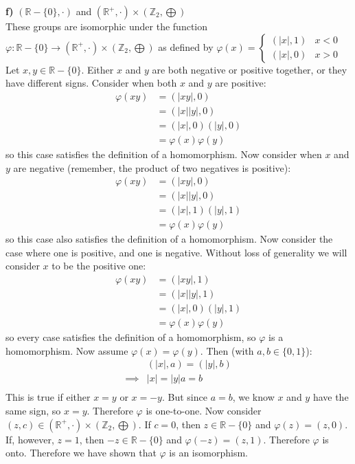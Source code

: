 \documentclass{scrartcl}
\begin{document}
\textbf{f)} $(\mathbb{R}-\{0\},\cdot)$ and
$(\mathbb{R}^+,\cdot)\times(\mathbb{Z}_2,\bigoplus)$\\
These groups are isomorphic under the function $\varphi : \mathbb{R} - \{0\}
\rightarrow (\mathbb{R}^+,\cdot)\times(\mathbb{Z}_2,\bigoplus)$ as defined by
$\varphi(x) =
  \begin{cases}
    (|x|,1) & x < 0\\
    (|x|,0) & x > 0
  \end{cases}$
Let $x,y \in \mathbb{R} - \{0\}$. Either $x$ and $y$ are both negative or
positive together, or they have different signs. Consider when both $x$ and $y$
are positive:
\begin{align*}
\varphi(xy) &= (|xy|,0)\\
            &= (|x||y|,0)\\
            &= (|x|,0)(|y|,0)\\
            &= \varphi(x)\varphi(y)
\end{align*}
so this case satisfies the definition of a homomorphism. Now consider when $x$
and $y$ are negative (remember, the product of two negatives is positive):
\begin{align*}
\varphi(xy) &= (|xy|,0)\\
            &= (|x||y|,0)\\
            &= (|x|,1)(|y|,1)\\
            &= \varphi(x)\varphi(y)
\end{align*}
so this case also satisfies the definition of a homomorphism. Now consider the
case where one is positive, and one is negative. Without loss of generality
we will consider $x$ to be the positive one:
\begin{align*}
\varphi(xy) &= (|xy|,1)\\
            &= (|x||y|,1)\\
            &= (|x|,0)(|y|,1)\\
            &= \varphi(x)\varphi(y)
\end{align*}
so every case satisfies the definition of a homomorphism, so $\varphi$ is a
homomorphism. Now assume $\varphi(x)=\varphi(y)$. Then (with $a,b \in \{0,1\}$):
\begin{align*}
         &(|x|,a) = (|y|,b)\\
\implies &|x|=|y| a=b\\
\end{align*}
This is true if either $x=y$ or $x=-y$. But since $a=b$, we know $x$ and $y$
have the same sign, so $x=y$. Therefore $\varphi$ is one-to-one. Now consider
$(z,c) \in (\mathbb{R}^+,\cdot)\times(\mathbb{Z}_2,\bigoplus)$. If $c=0$, then
$z \in \mathbb{R} - \{0\}$ and $\varphi(z) = (z,0)$. If, however, $z=1$, then
$-z \in \mathbb{R} - \{0\}$ and $\varphi(-z) = (z,1)$. Therefore $\varphi$ is
onto. Therefore we have shown that $\varphi$ is an isomorphism.\\
\end{document}
